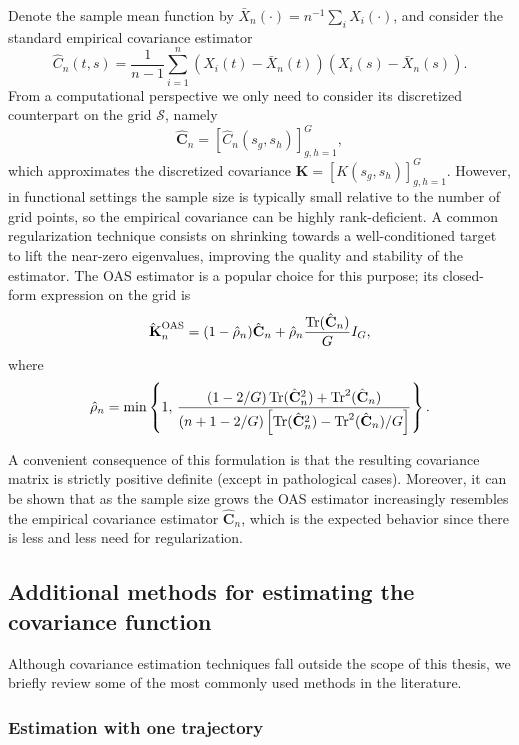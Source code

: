 Denote the sample mean function by \(\bar X_n(\cdot) = n^{-1}\sum_i X_i(\cdot)\), and consider the standard empirical covariance estimator
\[
\hat C_n(t,s) = \frac{1}{n-1}\sum_{i=1}^n (X_i(t)-\bar X_n(t))(X_i(s) - \bar X_n(s)).
\]
From a computational perspective we only need to consider its discretized counterpart on the grid \(\mathcal S\), namely 
\[
  \hat{\mathbf C}_n=\left[\hat{C}_n(s_g, s_h)\right]_{g,h=1}^G,
\]
which approximates the discretized covariance \(\mathbf K=[K(s_g, s_h)]_{g,h=1}^G\). However, in functional settings the sample size is typically small relative to the number of grid points, so the empirical covariance can be highly rank-deficient. A common regularization technique consists on shrinking towards a well-conditioned target to lift the near-zero eigenvalues, improving the quality and stability of the estimator. The \acf{OAS} estimator \citep{chen2010shrinkage} is a popular choice for this purpose; its closed-form expression on the grid is
\begin{equation}\label{eq:oas-estimator}
\hatbfKnOAS = (1-\hat\rho_n)\hat{\mathbf C}_n + \hat\rho_n \frac{\tr(\hat{\mathbf C}_n)}{G}I_G,
\end{equation}
where
\begin{equation}\label{eq:rho-oas}
\hat\rho_n = \min\left\{1,\, \frac{(1-2/G)\operatorname{Tr}(\hat{\mathbf C}_n^2) + \operatorname{Tr}^2(\hat{\mathbf C}_n)}{(n+1-2/G)\left[\operatorname{Tr}(\hat{\mathbf C}_n^2) - \operatorname{Tr}^2(\hat{\mathbf C}_n)/G \right]}\right\}.
\end{equation}

A convenient consequence of this formulation is that the resulting covariance matrix is strictly positive definite (except in pathological cases). Moreover, it can be shown that as the sample size grows the \acs{OAS} estimator increasingly resembles the empirical covariance estimator \(\hat{\mathbf C}_n\), which is the expected behavior since there is less and less need for regularization.

\subsection{Additional methods for estimating the covariance function}

Although covariance estimation techniques fall outside the scope of this thesis, we briefly review some of the most commonly used methods in the literature.

\subsubsection*{Estimation with one trajectory}


